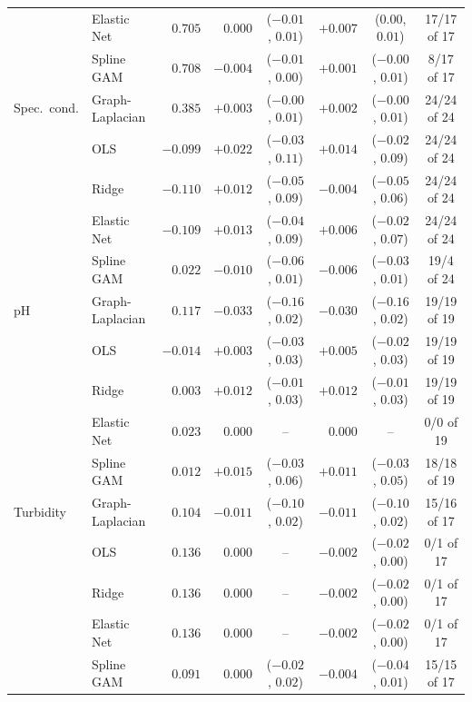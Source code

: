 \documentclass[11pt]{article}
\begin{document}
\begin{table}[h]
\begin{tabular}{ll r rc rc c}
              & Elastic Net     & $0.705$ & $0.000$ & ($-0.01$, $0.01$) & $\mathbf{+0.007}$ & ($0.00$, $0.01$) & 17/17 of 17 \\
              & Spline GAM      & $0.708$ & $-0.004$ & ($-0.01$, $0.00$) & $+0.001$ & ($-0.00$, $0.01$) & 8/17 of 17 \\
\addlinespace
Spec.\ cond.  & Graph-Laplacian & $0.385$ & $+0.003$ & ($-0.00$, $0.01$) & $+0.002$ & ($-0.00$, $0.01$) & 24/24 of 24 \\
              & OLS             & $-0.099$ & $+0.022$ & ($-0.03$, $0.11$) & $+0.014$ & ($-0.02$, $0.09$) & 24/24 of 24 \\
              & Ridge           & $-0.110$ & $+0.012$ & ($-0.05$, $0.09$) & $-0.004$ & ($-0.05$, $0.06$) & 24/24 of 24 \\
              & Elastic Net     & $-0.109$ & $+0.013$ & ($-0.04$, $0.09$) & $+0.006$ & ($-0.02$, $0.07$) & 24/24 of 24 \\
              & Spline GAM      & $0.022$ & $-0.010$ & ($-0.06$, $0.01$) & $-0.006$ & ($-0.03$, $0.01$) & 19/4 of 24 \\
\addlinespace
pH            & Graph-Laplacian & $0.117$ & $-0.033$ & ($-0.16$, $0.02$) & $-0.030$ & ($-0.16$, $0.02$) & 19/19 of 19 \\
              & OLS             & $-0.014$ & $+0.003$ & ($-0.03$, $0.03$) & $+0.005$ & ($-0.02$, $0.03$) & 19/19 of 19 \\
              & Ridge           & $0.003$ & $+0.012$ & ($-0.01$, $0.03$) & $+0.012$ & ($-0.01$, $0.03$) & 19/19 of 19 \\
              & Elastic Net     & $0.023$ & $0.000$ & -- & $0.000$ & -- & 0/0 of 19 \\
              & Spline GAM      & $0.012$ & $+0.015$ & ($-0.03$, $0.06$) & $+0.011$ & ($-0.03$, $0.05$) & 18/18 of 19 \\
\addlinespace
Turbidity     & Graph-Laplacian & $0.104$ & $-0.011$ & ($-0.10$, $0.02$) & $-0.011$ & ($-0.10$, $0.02$) & 15/16 of 17 \\
              & OLS             & $0.136$ & $0.000$ & -- & $-0.002$ & ($-0.02$, $0.00$) & 0/1 of 17 \\
              & Ridge           & $0.136$ & $0.000$ & -- & $-0.002$ & ($-0.02$, $0.00$) & 0/1 of 17 \\
              & Elastic Net     & $0.136$ & $0.000$ & -- & $-0.002$ & ($-0.02$, $0.00$) & 0/1 of 17 \\
              & Spline GAM      & $0.091$ & $0.000$ & ($-0.02$, $0.02$) & $-0.004$ & ($-0.04$, $0.01$) & 15/15 of 17 \\
\bottomrule
\end{tabular}
\end{table}
\end{document}
